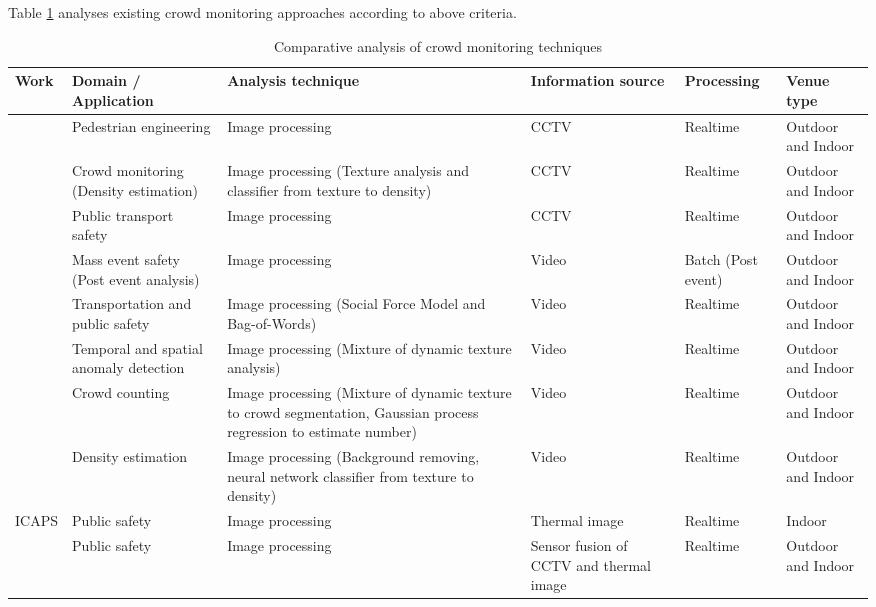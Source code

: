 Table \ref{table:crowdMonitoringTechAnalysis} analyses existing crowd monitoring approaches according to above criteria.

\begin{center}
	\begin{longtable}{|p{2cm}|p{2.5cm}|p{2.5cm}|p{2cm}|p{1.5cm}|p{2cm}|}
		\caption{Comparative analysis of crowd monitoring techniques}
		\label{table:crowdMonitoringTechAnalysis} \\
		\hline
		\textbf{Work} & \textbf{Domain / Application} & \textbf{Analysis technique} & \textbf{Information source} & \textbf{Processing} & \textbf{Venue type} \\
		\hline \hline
		\textcite{Davies1995} & Pedestrian engineering & Image processing & CCTV & Realtime & Outdoor and Indoor \\
		\hline
		\textcite{Marana1997} & Crowd monitoring (Density estimation) & Image processing (Texture analysis and classifier from texture to density) & CCTV & Realtime & Outdoor and Indoor \\
		\hline
		\textcite{Velastin1999} & Public transport safety & Image processing & CCTV & Realtime & Outdoor and Indoor \\
		\hline
		\textcite{Johansson2008} & Mass event safety (Post event analysis) & Image processing & Video & Batch (Post event) & Outdoor and Indoor \\
		\hline
		\textcite{Mehran2009} & Transportation and public safety & Image processing (Social Force Model and Bag-of-Words) & Video & Realtime & Outdoor and Indoor \\
		\hline
		\textcite{Mahadevan2010} & Temporal and spatial anomaly detection & Image processing (Mixture of dynamic texture analysis) & Video & Realtime & Outdoor and Indoor \\
		\hline
		\textcite{Chan2008} & Crowd counting & Image processing (Mixture of dynamic texture to crowd segmentation, Gaussian process regression to estimate number) & Video & Realtime & Outdoor and Indoor \\
		\hline
		\textcite{Li2010} & Density estimation & Image processing (Background removing, neural network classifier from texture to density) & Video & Realtime & Outdoor and Indoor \\
		\hline
		ICAPS \parencite{Pham2007} & Public safety & Image processing & Thermal image & Realtime & Indoor \\
		\hline
		\textcite{Andersson2009} & Public safety & Image processing & Sensor fusion of CCTV and thermal image & Realtime & Outdoor and Indoor \\

\end{longtable}
\end{center}
